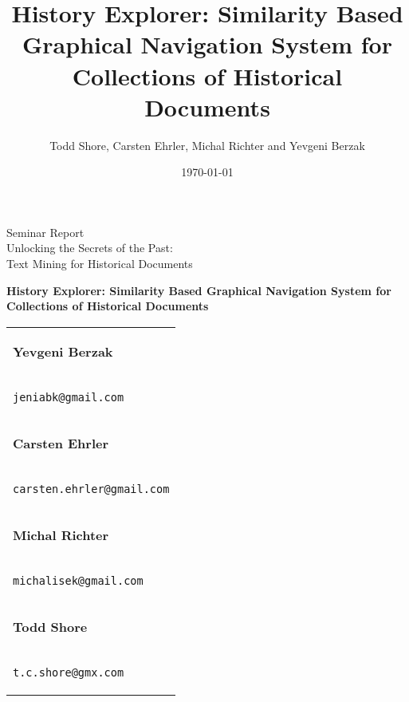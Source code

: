 \documentclass[paper=a4,draft=false]{scrartcl}
\title{History Explorer: Similarity Based Graphical Navigation System for Collections of Historical Documents}
\author{Todd Shore, Carsten Ehrler, Michal Richter and Yevgeni Berzak}
\date{\today}
\begin{document}
\ifpdf
{}
\else
{}
\fi


\begin{titlepage}
\begin{center}
  \vspace{.8in}
  \begin{large}
    Seminar Report \\
  \vspace{.1in}
    Unlocking the Secrets of the Past:\\
    Text Mining for Historical Documents\\
  \end{large}

  \vspace{1.2in}

  \begin{LARGE}
    \textbf{History Explorer: Similarity Based Graphical Navigation System for Collections of Historical Documents}
  \end{LARGE}

  \vspace{2.5in}

  \end{center}

  \begin{flushright}
    \begin{tabular}{l}
      \begin{large}\textbf{Yevgeni Berzak}\end{large} \\
      \begin{large}\texttt{jeniabk@gmail.com} \end{large}
      \vspace{.20in}\\
      \begin{large}\textbf{Carsten Ehrler}\end{large} \\
      \begin{large}\texttt{carsten.ehrler@gmail.com} \end{large}
      \vspace{.20in}\\
      \begin{large}\textbf{Michal Richter}\end{large} \\
      \begin{large}\texttt{michalisek@gmail.com} \end{large}
      \vspace{.20in}\\
      \begin{large}\textbf{Todd Shore}\end{large} \\
      \begin{large}\texttt{t.c.shore@gmx.com} \end{large}
    \end{tabular}
  \end{flushright}
\end{titlepage}
\end{document}
